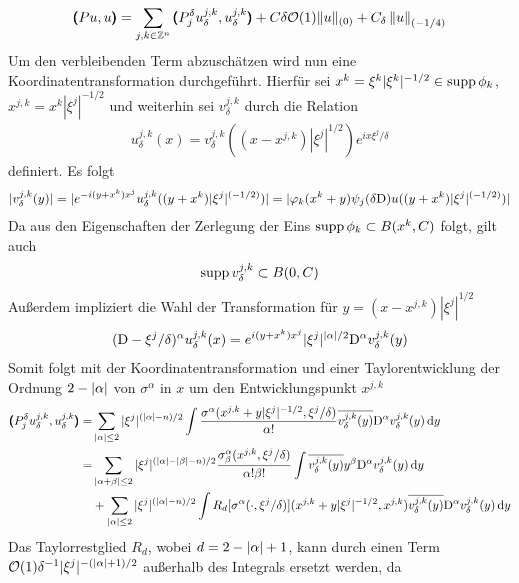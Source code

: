 \begin{align*}
\pmb(Pu,u\pmb) = \sum_{j,k\in\mathbb Z^n} \pmb(P^\delta_j u_\delta^{j,k},u_\delta^{j,k}\pmb) + C\delta\mathcal O(1)\lVert u\rVert _{(0)} + C_\delta \left\lVert u\right\rVert _{(-1/4)}
\end{align*}
Um den verbleibenden Term abzuschätzen wird nun eine Koordinatentransformation durchgeführt. Hierfür sei $x^k = \xi^k |\xi^k|^{-1/2}\in\operatorname{supp} \phi_k$, $x^{j,k}=x^k |\xi^j|^{-1/2}$ und weiterhin sei $v^{j,k}_\delta$ durch die Relation
\begin{align*}
u^{j,k}_\delta(x) = v^{j,k}_\delta ((x-x^{j,k})|\xi^j|^{1/2}) e^{ix\xi^j/\delta}
\end{align*}
definiert. Es folgt
\begin{align*}
|v^{j,k}_\delta(y)| = \lvert e^{-i(y+x^k)x^j}u^{j,k}_\delta((y+x^k)|\xi^j|^{(-1/2)})\rvert = |\varphi_k(x^k+y)\psi_j(\delta\mathrm D)u((y+x^k)|\xi^j|^{(-1/2)})|
\end{align*}
Da aus den Eigenschaften der Zerlegung der Eins $\operatorname{supp} \phi_k \subset B(x^k,C)$ folgt, gilt auch
\begin{align*}
\operatorname{supp} v^{j,k}_\delta \subset B(0,C)
\end{align*}
Außerdem impliziert die Wahl der Transformation für $y=(x-x^{j,k})|\xi^j|^{1/2}$
\begin{align*}
(\mathrm D - \xi^j/\delta)^\alpha u^{j,k}_\delta(x)=  e^{i(y+x^k)x^j}|\xi^j|^{\lvert\alpha\rvert/2}\mathrm D^\alpha v^{j,k}_\delta(y)
\end{align*}
Somit folgt mit der Koordinatentransformation und einer Taylorentwicklung der Ordnung $2-\lvert\alpha\rvert$ von $\sigma^\alpha$ in $x$ um den Entwicklungspunkt $x^{j,k}$
\begin{align}
\pmb(P^\delta_j u_\delta^{j,k},u_\delta^{j,k}\pmb)
=& \sum_{\lvert\alpha\rvert\le 2} |\xi^j|^{(\lvert\alpha\rvert-n)/2}\int \frac{\sigma^\alpha(x^{j,k}+y|\xi^j|^{-1/2},\xi^j/\delta)}{\alpha!}\overline{v^{j,k}_\delta(y)}\mathrm D^\alpha v^{j,k}_\delta(y)\,\mathrm d y\nonumber\\ \label{termnachkoordtransf}
=& \sum_{\lvert\alpha+\beta\rvert\le 2}|\xi^j|^{(\lvert\alpha\rvert-\lvert\beta\rvert-n)/2} \frac{\sigma^\alpha_\beta(x^{j,k},\xi^j/\delta)}{\alpha!\beta!}\int\overline{v^{j,k}_\delta(y)}y^\beta\mathrm D^\alpha v^{j,k}_\delta(y)\,\mathrm d y\\
&+\sum_{\lvert\alpha\rvert\le 2}|\xi^j|^{(\lvert\alpha\rvert-n)/2}\int R_{d}[\sigma^\alpha(\cdot,\xi^j/\delta)](x^{j,k}+y|\xi^j|^{-1/2},x^{j,k})\overline{v^{j,k}_\delta(y)}\mathrm D^\alpha v^{j,k}_\delta(y)\,\mathrm d y\nonumber
\end{align}
Das Taylorrestglied $R_d$, wobei $d=2-\lvert\alpha\rvert+1$, kann durch einen Term $\mathcal O(1)\delta^{-1}|\xi^j|^{-(\lvert\alpha\rvert+1)/2}$ außerhalb des Integrals ersetzt werden, da

